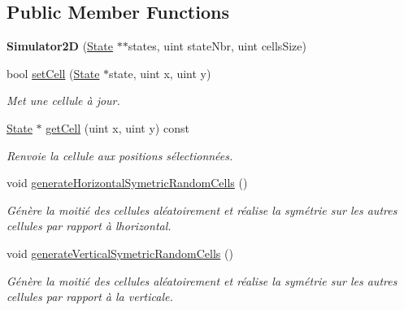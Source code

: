 \subsection*{Public Member Functions}
\begin{DoxyCompactItemize}
\item 
\mbox{\label{class_simulator2_d_a51abb01203ca34d322afe50de74a9843}} 
{\bfseries Simulator2D} (\mbox{\hyperlink{class_state}{State}} $\ast$$\ast$states, uint state\+Nbr, uint cells\+Size)
\item 
bool \mbox{\hyperlink{class_simulator2_d_abeeb707f6eef5355d94e41848bdffc56}{set\+Cell}} (\mbox{\hyperlink{class_state}{State}} $\ast$state, uint x, uint y)
\begin{DoxyCompactList}\small\item\em Met une cellule à jour. \end{DoxyCompactList}\item 
\mbox{\hyperlink{class_state}{State}} $\ast$ \mbox{\hyperlink{class_simulator2_d_ad62d4ce6ea01879a9ff84718e5bdc092}{get\+Cell}} (uint x, uint y) const
\begin{DoxyCompactList}\small\item\em Renvoie la cellule aux positions sélectionnées. \end{DoxyCompactList}\item 
\mbox{\label{class_simulator2_d_a3a2ca51575ab99653aae5293048926b2}} 
void \mbox{\hyperlink{class_simulator2_d_a3a2ca51575ab99653aae5293048926b2}{generate\+Horizontal\+Symetric\+Random\+Cells}} ()
\begin{DoxyCompactList}\small\item\em Génère la moitié des cellules aléatoirement et réalise la symétrie sur les autres cellules par rapport à l\textquotesingle{}horizontal. \end{DoxyCompactList}\item 
\mbox{\label{class_simulator2_d_a35f64616ae0e63898d2dfb51fff19ca7}} 
void \mbox{\hyperlink{class_simulator2_d_a35f64616ae0e63898d2dfb51fff19ca7}{generate\+Vertical\+Symetric\+Random\+Cells}} ()
\begin{DoxyCompactList}\small\item\em Génère la moitié des cellules aléatoirement et réalise la symétrie sur les autres cellules par rapport à la verticale. \end{DoxyCompactList}\item 
$$
\end{DoxyCompactItemize}
